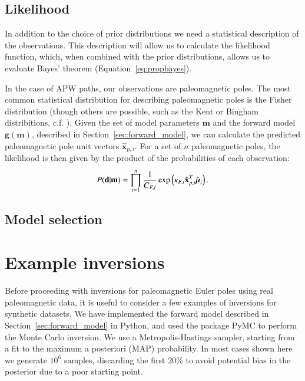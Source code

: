 \documentclass[preprint,12pt,authoryear]{elsarticle}
\newcommand{\mitbf}[1]{\hbox{\mathversion{bold}$#1$}}
\begin{document}
\subsection{Likelihood}
\label{sec:likelihood}
In addition to the choice of prior distributions we need a statistical description of the observations.
This description will allow us to calculate the likelihood function, which, when combined with the prior distributions,
allows us to evaluate Bayes' theorem (Equation~\eqref{eq:propbayes}).

In the case of APW paths, our observations are paleomagnetic poles.
The most common statistical distribution for describing paleomagnetic poles is the Fisher distribution
(though others are possible, such as the Kent or Bingham distribitions, c.f. \citet{tauxe2009essentials}).
Given the set of model parameters $\mathbf{m}$ and the forward model $\mathbf{g}(\mathbf{m})$, described
in Section~\ref{sec:forward_model}, we can calculate the predicted paleomagnetic pole unit vectors $\hat{\mathbf{x}}_{p,i}$.
For a set of $n$ paleomagnetic poles, the likelihood is then given by the product of the probabilities
of each observation:
\begin{equation}
P(\mathbf{d} \vert \mathbf{m}) = \displaystyle\prod_{i=1}^n \frac{1}{C_{F,i}} \exp \left( \kappa_{F,i} \hat{\mathbf{x}}_{p,i}^T \hat{\mitbf{\mu}}_i \right).
\label{eq:model_likelihood}
\end{equation}


\subsection{Model selection}

\section{Example inversions}
\label{sec:example_inversion}

Before proceeding with inversions for paleomagnetic Euler poles using real paleomagnetic data,
it is useful to consider a few examples of inversions for synthetic datasets.
We have implemented the forward model described in Section~\ref{sec:forward_model}
in Python, and used the package PyMC \citep{patil2010pymc} to perform the Monte Carlo inversion.
We use a Metropolis-Hastings sampler, starting from a fit to the maximum a posteriori (MAP) probability.
In most cases shown here we generate $10^6$ samples, discarding the first 20\% to avoid
potential bias in the posterior due to a poor starting point.
\end{document}
